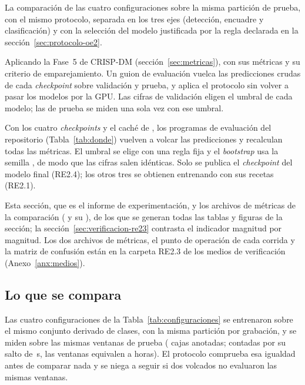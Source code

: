  La comparación de las cuatro configuraciones sobre la misma
partición de prueba, con el mismo protocolo, separada en los tres ejes
(detección, encuadre y clasificación) y con la selección del modelo justificada
por la regla declarada en la sección~\ref{sec:protocolo-oe2}.

 Aplicando la Fase~5 de CRISP-DM
(sección~\ref{sec:metricas}), con sus métricas y su criterio de emparejamiento.
Un guion de evaluación vuelca las predicciones crudas de cada \textit{checkpoint}
sobre validación y prueba, y aplica el protocolo sin volver a pasar los modelos por la
GPU. Las cifras de validación
eligen el umbral de cada modelo; las de prueba se miden una sola vez con ese
umbral.

 Con los cuatro \textit{checkpoints} y el caché de
, los programas de evaluación del repositorio
(Tabla~\ref{tab:donde}) vuelven a volcar las predicciones y recalculan todas las
métricas. El umbral se elige con una
regla fija y el \textit{bootstrap} usa la semilla \pSeed{}, de modo que las
cifras salen idénticas. Solo se publica el \textit{checkpoint} del modelo final
(RE2.4); los otros tres se obtienen entrenando con sus recetas (RE2.1).

 Esta sección, que es el informe de
experimentación, y los archivos de métricas de la comparación
( y su ),
de los que se generan todas las tablas y figuras de la sección; la
sección~\ref{sec:verificacion-re23} contrasta el indicador magnitud por magnitud.
Los dos archivos de métricas, el punto de operación de cada corrida y la matriz de
confusión están en la carpeta RE2.3 de los medios de verificación
(Anexo~\ref{anx:medios}).

\subsection{Lo que se compara}

Las cuatro configuraciones de la Tabla~\ref{tab:configuraciones} se entrenaron
sobre el mismo conjunto derivado de \nClasses{} clases, con la misma partición
por grabación, y se miden sobre las mismas \nWindowsTest{} ventanas de prueba
(\nBoxesTest{} cajas anotadas; contadas por su salto de \clipHop{}\,s, las
ventanas equivalen a \rHoursTest{} horas). El protocolo
comprueba esa igualdad antes de comparar nada y se niega a seguir si dos volcados
no evaluaron las mismas ventanas.

